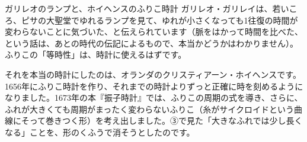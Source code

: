 \begin{column}{ガリレオのランプと、ホイヘンスのふりこ時計}
ガリレオ・ガリレイは、若いころ、ピサの大聖堂でゆれるランプを見て、ゆれが小さくなっても1往復の時間が変わらないことに気づいた、と伝えられています（脈をはかって時間を比べた、という話は、あとの時代の伝記によるもので、本当かどうかはわかりません）。ふりこの「等時性」は、時計に使えるはずです。

それを本当の時計にしたのは、オランダのクリスティアーン・ホイヘンスです。1656年にふりこ時計を作り、それまでの時計よりずっと正確に時を刻めるようになりました。1673年の本『振子時計』では、ふりこの周期の式を導き、さらに、ふれが大きくても周期がまったく変わらないふりこ（糸がサイクロイドという曲線にそって巻きつく形）を考え出しました。③で見た「大きなふれでは少し長くなる」ことを、形のくふうで消そうとしたのです。
\end{column}

